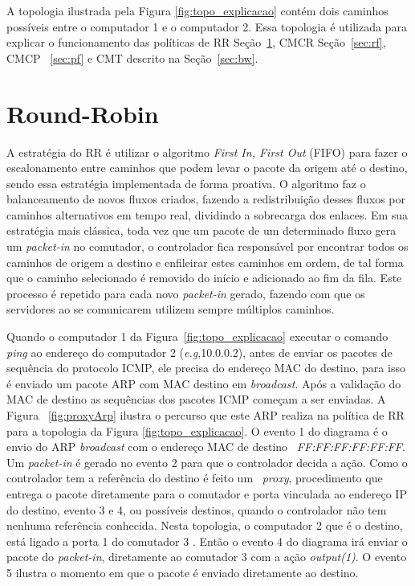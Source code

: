 A topologia ilustrada pela Figura \ref{fig:topo_explicacao}  contém dois caminhos possíveis entre o computador 1 e o computador 2. Essa topologia é utilizada para explicar o funcionamento das políticas de RR Seção~\ref{sec:rr}, CMCR Seção~\ref{sec:rf}, CMCP ~\ref{sec:pf} e CMT descrito na Seção~\ref{sec:bw}.


\section{Round-Robin}
\label{sec:rr}
A estratégia do RR é utilizar o algoritmo \emph{First In, First Out} (FIFO) para fazer o escalonamento entre caminhos que podem levar o pacote da origem até o destino, sendo  essa estratégia implementada de forma proativa. O algoritmo faz o balanceamento de novos fluxos criados, fazendo a redistribuição desses fluxos por caminhos alternativos em tempo real, dividindo a sobrecarga dos enlaces. 
Em sua estratégia mais clássica, toda vez que um pacote de um determinado fluxo gera um \textit{packet-in} no comutador, o controlador fica responsável por encontrar todos os caminhos de origem a destino e enfileirar estes caminhos em ordem, de tal forma que o caminho selecionado é removido do início e adicionado ao fim da fila. Este processo é repetido para cada novo \textit{packet-in} gerado, fazendo com que os servidores ao se comunicarem utilizem sempre múltiplos caminhos.

Quando o computador 1 da Figura~\ref{fig:topo_explicacao} executar o comando \textit{ping} ao endereço do computador 2 (\textit{e.g},10.0.0.2), antes de enviar os pacotes de sequência do protocolo ICMP, ele precisa do endereço MAC do destino, para isso é enviado um pacote ARP com MAC destino em \emph{broadcast}. Após a validação do MAC de destino as sequências dos pacotes ICMP começam a ser enviadas. A Figura ~\ref{fig:proxyArp} ilustra o percurso que este ARP realiza na política de RR para a topologia da Figura \ref{fig:topo_explicacao}. O evento 1 do diagrama é o envio do ARP \emph{broadcast} com o endereço MAC de destino ~\emph{FF:FF:FF:FF:FF:FF}. Um \emph{packet-in} é gerado no evento 2 para que o controlador decida a ação. Como o controlador tem a referência do destino é feito um ~\emph{proxy},  procedimento que  entrega o pacote diretamente para o comutador e porta vinculada ao endereço IP do destino, evento 3 e 4, ou possíveis destinos, quando o controlador não tem nenhuma referência conhecida. Nesta topologia, o computador 2 que é o destino, está ligado a porta 1 do comutador 3  . Então o evento 4 do diagrama irá enviar o pacote do \textit{packet-in}, diretamente ao comutador 3 com a ação \textit{output(1)}. O evento 5 ilustra o momento em que o pacote é enviado diretamente ao destino. 

